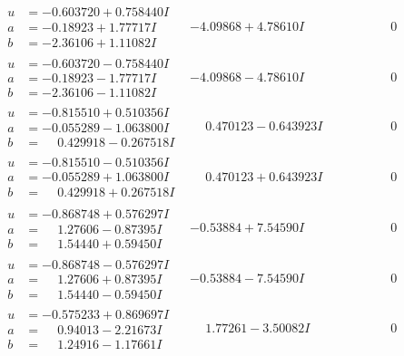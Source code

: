 \documentclass[1p]{elsarticle_modified}
\theoremstyle{definition}
\begin{document}
$$\begin{array}{c|c|c}
\begin{aligned}
u &= -0.603720 + 0.758440 I \\
a &= -0.18923 + 1.77717 I \\
b &= -2.36106 + 1.11082 I\end{aligned}
 & -4.09868 + 4.78610 I & \phantom{-0.000000 } 0 \\ \hline\begin{aligned}
u &= -0.603720 - 0.758440 I \\
a &= -0.18923 - 1.77717 I \\
b &= -2.36106 - 1.11082 I\end{aligned}
 & -4.09868 - 4.78610 I & \phantom{-0.000000 } 0 \\ \hline\begin{aligned}
u &= -0.815510 + 0.510356 I \\
a &= -0.055289 - 1.063800 I \\
b &= \phantom{-}0.429918 - 0.267518 I\end{aligned}
 & \phantom{-}0.470123 - 0.643923 I & \phantom{-0.000000 } 0 \\ \hline\begin{aligned}
u &= -0.815510 - 0.510356 I \\
a &= -0.055289 + 1.063800 I \\
b &= \phantom{-}0.429918 + 0.267518 I\end{aligned}
 & \phantom{-}0.470123 + 0.643923 I & \phantom{-0.000000 } 0 \\ \hline\begin{aligned}
u &= -0.868748 + 0.576297 I \\
a &= \phantom{-}1.27606 - 0.87395 I \\
b &= \phantom{-}1.54440 + 0.59450 I\end{aligned}
 & -0.53884 + 7.54590 I & \phantom{-0.000000 } 0 \\ \hline\begin{aligned}
u &= -0.868748 - 0.576297 I \\
a &= \phantom{-}1.27606 + 0.87395 I \\
b &= \phantom{-}1.54440 - 0.59450 I\end{aligned}
 & -0.53884 - 7.54590 I & \phantom{-0.000000 } 0 \\ \hline\begin{aligned}
u &= -0.575233 + 0.869697 I \\
a &= \phantom{-}0.94013 - 2.21673 I \\
b &= \phantom{-}1.24916 - 1.17661 I\end{aligned}
 & \phantom{-}1.77261 - 3.50082 I & \phantom{-0.000000 } 0 \\ \hline\begin{aligned}

\end{aligned}
\end{array}$$
\end{document}
